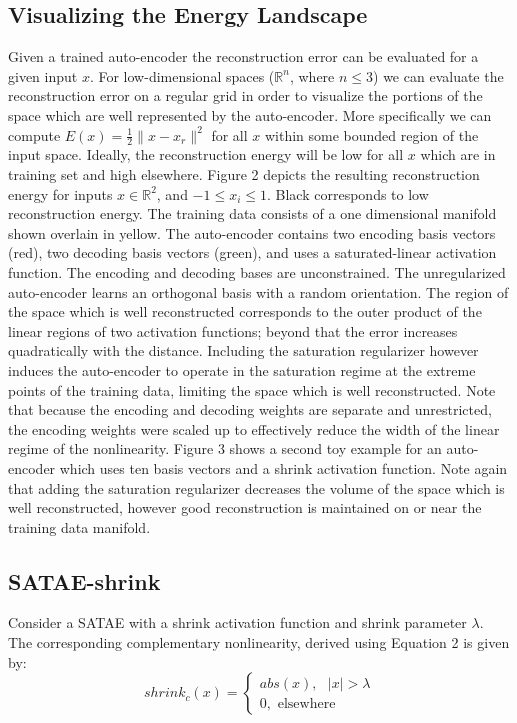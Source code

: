 \documentclass{article} %
\begin{document}
\subsection{Visualizing the Energy Landscape}  Given a trained auto-encoder the
reconstruction error can be evaluated for a given input $x$. For
low-dimensional spaces ($\mathbb{R}^n$, where $n \leq 3$) we can evaluate the
reconstruction error on a regular grid in order to visualize the portions of
the space which are well represented by the auto-encoder. More specifically we
can compute $E(x) = \frac{1}{2} \|x - x_r \|^2$ for all $x$ within some bounded
region of the input space. Ideally, the reconstruction energy will be low for
all $x$ which are in training set and high elsewhere. Figure 2 depicts the
resulting reconstruction energy for inputs $x \in \mathbb{R}^2$, and  $-1 \leq
x_i \leq 1$. Black corresponds to low reconstruction energy. The training data
consists of a one dimensional manifold shown overlain in yellow. The
auto-encoder contains two encoding basis vectors (red), two decoding basis
vectors (green), and uses a saturated-linear activation function. The encoding
and decoding bases are unconstrained. The unregularized auto-encoder learns an
orthogonal basis with a random orientation. The region of the space which is
well reconstructed corresponds to the outer product of the linear regions of
two activation functions; beyond that the error increases quadratically with
the distance. Including the saturation regularizer however induces the
auto-encoder to operate in the saturation regime at the extreme points of the
training data, limiting the space which is well reconstructed. Note that
because the encoding and decoding weights are separate and unrestricted, the
encoding weights were scaled up to effectively reduce the width of the linear
regime of the nonlinearity. Figure 3 shows a second toy example for an
auto-encoder which uses ten basis vectors and a shrink activation function.
Note again that adding the saturation regularizer decreases the volume of the
space which is well reconstructed, however good reconstruction is maintained on
or near the training data manifold. 

\subsection{SATAE-shrink} Consider a SATAE with a shrink activation function
and shrink parameter $\lambda$. The corresponding complementary nonlinearity,
derived using Equation 2 is given by: \begin{equation} \nonumber shrink_c(x) =
\begin{cases} abs(x), \text{ } |x| > \lambda\\ 0, \text{ elsewhere} \end{cases}
\end{equation} 
\end{document}
